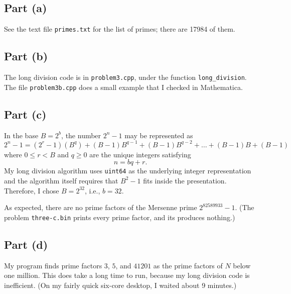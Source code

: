 \documentclass{article}
\theoremstyle{definition}
\begin{document}
\subsection{Part (a)}
See the text file \texttt{primes.txt} for the list of primes;
there are 17984 of them.


\subsection{Part (b)}
The long division code is in \texttt{problem3.cpp}, under the function
\texttt{long\_division}. The file \texttt{problem3b.cpp}
does a small example that I checked in Mathematica. 

\subsection{Part (c)}
In the base $B = 2^b$, the number $2^n - 1$ may be represented
as
\begin{equation}
2^n - 1 = (2^r-1) (B^q) + (B-1) B^{q-1} + (B-1) B^{q-2} + \dots + (B-1) B + (B-1)
\end{equation}
where $0 \leq r < B$ and $q \geq 0$ are the unique integers satisfying
\begin{equation}
n = bq + r.
\end{equation}
My long division algorithm uses \texttt{uint64} as the underlying integer representation
and the algorithm itself requires that $B^2-1$ fits inside the presentation. Therefore,
I chose $B = 2^{32}$, i.e., $b = 32$.

As expected, there are no prime factors of the Mersenne prime
$2^{82589933} - 1$. (The problem \texttt{three-c.bin} prints every prime
factor, and its produces nothing.)

\subsection{Part (d)}
My program finds prime factors $3$, $5$, and $41201$ as the prime factors
of $N$ below one million. This does take a long time to run, because my
long division code is inefficient. (On my fairly quick six-core desktop,
I waited about 9 minutes.)
\end{document}
